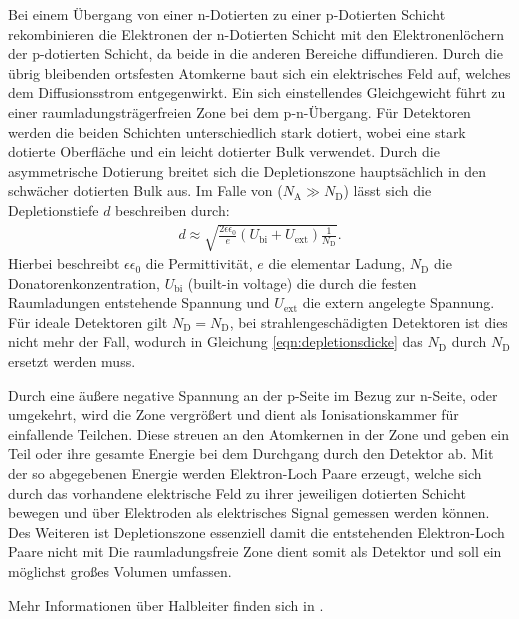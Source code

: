 Bei einem Übergang von einer n-Dotierten zu einer p-Dotierten Schicht rekombinieren
die Elektronen der n-Dotierten Schicht mit den Elektronenlöchern der p-dotierten Schicht, da beide
in die anderen Bereiche diffundieren. Durch die übrig bleibenden ortsfesten Atomkerne
baut sich ein elektrisches Feld auf, welches dem Diffusionsstrom entgegenwirkt.
Ein sich einstellendes Gleichgewicht führt zu einer raumladungsträgerfreien Zone bei
dem p-n-Übergang.
Für Detektoren werden die beiden Schichten unterschiedlich stark dotiert, wobei eine
stark dotierte Oberfläche und ein leicht dotierter Bulk verwendet. Durch die asymmetrische
Dotierung breitet sich die Depletionszone hauptsächlich in den schwächer dotierten Bulk aus.
Im Falle von ($N_{\mathrm{A}} \gg N_{\mathrm{D}}$) lässt sich die Depletionstiefe $d$ beschreiben durch:
\begin{align}
  d \approx \sqrt{\frac{2 \epsilon \epsilon_0}{e} (U_{\mathrm{bi}}+U_{\mathrm{ext}})\frac{1}{N_{\mathrm{D}}}}.
  \label{eqn:depletionsdicke}
\end{align}
Hierbei beschreibt $\epsilon \epsilon_0$ die Permittivität, $e$ die elementar Ladung, $N_{\mathrm{D}}$ die Donatorenkonzentration, $U_{\mathrm{bi}}$ (built-in voltage)  die
durch die festen Raumladungen entstehende Spannung und $U_{\mathrm{ext}}$ die extern angelegte Spannung. Für ideale Detektoren gilt $N_{\mathrm{D}} = N_{\mathrm{D}}$, bei
strahlengeschädigten Detektoren ist dies nicht mehr der Fall, wodurch in Gleichung \ref{eqn:depletionsdicke} das $N_{\mathrm{D}}$ durch $N_{\mathrm{D}}$ ersetzt werden muss.


Durch eine äußere negative Spannung  an der p-Seite im Bezug zur n-Seite, oder umgekehrt, wird die Zone vergrößert und dient als Ionisationskammer für einfallende Teilchen. Diese streuen
an den Atomkernen in der Zone und geben ein Teil oder ihre gesamte Energie bei dem Durchgang durch den Detektor ab. Mit der so abgegebenen
Energie werden Elektron-Loch Paare erzeugt, welche sich durch das vorhandene elektrische Feld zu ihrer jeweiligen dotierten
Schicht bewegen und über Elektroden als elektrisches Signal gemessen werden können. Des Weiteren ist Depletionszone essenziell damit
die entstehenden Elektron-Loch Paare nicht mit
Die raumladungsfreie Zone dient somit als Detektor und soll ein möglichst großes Volumen umfassen.

Mehr Informationen über Halbleiter finden sich in  \cite{semiconductor}.

